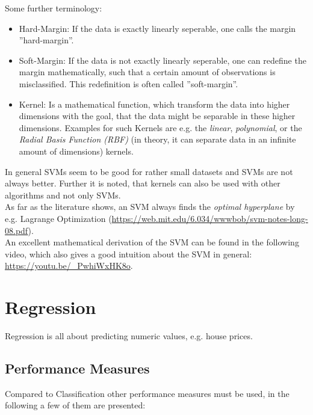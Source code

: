 \documentclass[12pt,a4paper]{article}
\begin{document}
Some further terminology:\\
\begin{itemize}
    \item Hard-Margin: If the data is exactly linearly seperable, one calls the margin ''hard-margin''.
    \item Soft-Margin: If the data is not exactly linearly seperable, one can redefine the margin mathematically, such that a certain amount of observations is misclassified. This redefinition is often called ''soft-margin''.
    \item Kernel: Is a mathematical function, which transform the data into higher dimensions with the goal, that the data might be separable in these higher dimensions. Examples for such Kernels are e.g. the \textit{linear}, \textit{polynomial}, or the \textit{Radial Basis Function (RBF)} (in theory, it can separate data in an infinite amount of dimensions) kernels. 
\end{itemize}

\noindent In general SVMs seem to be good for rather small datasets and SVMs are not always better. Further it is noted, that kernels can also be used with other algorithms and not only SVMs.\\
As far as the literature shows, an SVM always finds the \textit{optimal hyperplane} by e.g. Lagrange Optimization (\url{https://web.mit.edu/6.034/wwwbob/svm-notes-long-08.pdf}).\\
An excellent mathematical derivation of the SVM can be found in the following video, which also gives a good intuition about the SVM in general: \url{https://youtu.be/_PwhiWxHK8o}.


\newpage
\section{Regression}

\noindent Regression is all about predicting numeric values, e.g. house prices.\\

\subsection{Performance Measures}

\noindent Compared to Classification other performance measures must be used, in the following a few of them are presented:
\end{document}
